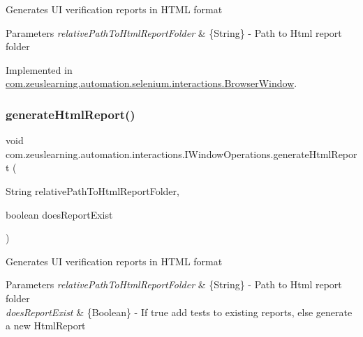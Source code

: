 Generates UI verification reports in H\+T\+ML format


\begin{DoxyParams}{Parameters}
{\em relative\+Path\+To\+Html\+Report\+Folder} & \{String\} -\/ Path to Html report folder \\
\hline
\end{DoxyParams}


Implemented in \hyperlink{classcom_1_1zeuslearning_1_1automation_1_1selenium_1_1interactions_1_1BrowserWindow_a72167c76169cf3c9b4d270da983f5036}{com.\+zeuslearning.\+automation.\+selenium.\+interactions.\+Browser\+Window}.

\hypertarget{interfacecom_1_1zeuslearning_1_1automation_1_1interactions_1_1IWindowOperations_af2edf0ff09f4c8e40ed4f2f42ff00582}{}\label{interfacecom_1_1zeuslearning_1_1automation_1_1interactions_1_1IWindowOperations_af2edf0ff09f4c8e40ed4f2f42ff00582} 
\subsubsection{\texorpdfstring{generate\+Html\+Report()}{generateHtmlReport()}\hspace{0.1cm}{\footnotesize\ttfamily [2/2]}}
{\footnotesize\ttfamily void com.\+zeuslearning.\+automation.\+interactions.\+I\+Window\+Operations.\+generate\+Html\+Report (\begin{DoxyParamCaption}\item[{String}]{relative\+Path\+To\+Html\+Report\+Folder,  }\item[{boolean}]{does\+Report\+Exist }\end{DoxyParamCaption})}

Generates UI verification reports in H\+T\+ML format


\begin{DoxyParams}{Parameters}
{\em relative\+Path\+To\+Html\+Report\+Folder} & \{String\} -\/ Path to Html report folder \\
\hline
{\em does\+Report\+Exist} & \{Boolean\} -\/ If {\ttfamily true} add tests to existing reports, else generate a new Html\+Report \\
\hline
\end{DoxyParams}


